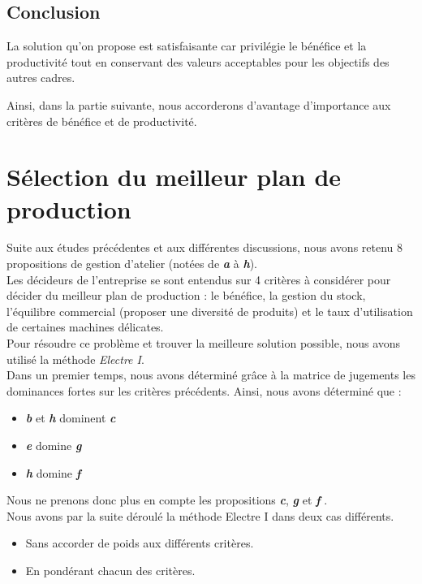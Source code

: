 \documentclass[12pt]{article}
\begin{document}
\subsection*{Conclusion}
La solution qu'on propose est satisfaisante car privilégie le bénéfice et la productivité tout en conservant des valeurs acceptables pour les objectifs des autres cadres.

\noindent Ainsi, dans la partie suivante, nous accorderons d'avantage d'importance aux critères de bénéfice et de productivité.

\section{Sélection du meilleur plan de production}
Suite aux études précédentes et aux différentes discussions, nous avons retenu 8 propositions de gestion d'atelier (notées de \textbf{\emph{a}} à \textbf{\emph{h}}).\\
Les décideurs de l'entreprise se sont entendus sur 4 critères à considérer pour décider du meilleur plan de production : le bénéfice, la gestion du stock, l'équilibre commercial (proposer une diversité de produits) et le taux d'utilisation de certaines machines délicates.\\
Pour résoudre ce problème et trouver la meilleure solution possible, nous avons utilisé la méthode \emph{Electre I}.\\
Dans un premier temps, nous avons déterminé grâce à la matrice de jugements les dominances fortes sur les critères précédents. Ainsi, nous avons déterminé que :
\begin{itemize}
\item \textbf{\emph{b}} et \textbf{\emph{h}} dominent \textbf{\emph{c}}
\item \textbf{\emph{e}} domine \textbf{\emph{g}}
\item \textbf{\emph{h}} domine \textbf{\emph{f}}
\end{itemize}
Nous ne prenons donc plus en compte les propositions \textbf{\emph{c}}, \textbf{\emph{g}} et \textbf{\emph{f}} .\\
Nous avons par la suite déroulé la méthode Electre I dans deux cas différents. 
\begin{itemize}
\item Sans accorder de poids aux différents critères.
\item En pondérant chacun des critères.
\end{itemize}
\end{document}
